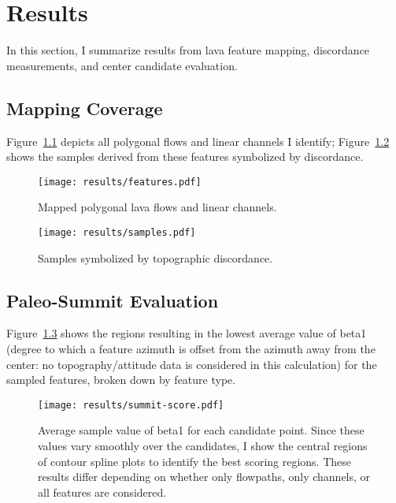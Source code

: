 \chapter{Results}\label{cha:results}

In this section, I summarize results from lava feature mapping, discordance measurements, and center candidate evaluation. 

\section{Mapping Coverage}

Figure~\ref{fig:features} depicts all polygonal flows and linear channels I identify; Figure~\ref{fig:results-coverage} shows the samples derived from these features symbolized by discordance.

\begin{figure}
    \texttt{[image: results/features.pdf]}%
    \caption[Mapped lava features]{Mapped polygonal lava flows and linear channels.}%
    \label{fig:features}
\end{figure}

\begin{figure}
    \texttt{[image: results/samples.pdf]}%
    \caption[Mapped topographic discordance]{Samples symbolized by topographic discordance.}%
    \label{fig:results-coverage}
\end{figure}

\section{Paleo-Summit Evaluation}

Figure~\ref{fig:summit-score} shows the regions resulting in the lowest average value of \acs{beta1} (degree to which a feature azimuth is offset from the azimuth away from the center: no topography/attitude data is considered in this calculation) for the sampled features, broken down by feature type.

\begin{figure}
    \texttt{[image: results/summit-score.pdf]}%
    \caption[Paleo-summit evaluation]{Average sample value of \acs{beta1} for each candidate point. Since these values vary smoothly over the candidates, I show the central regions of contour spline plots to identify the best scoring regions. These results differ depending on whether only flowpaths, only channels, or all features are considered.}%
    \label{fig:summit-score}
\end{figure}

